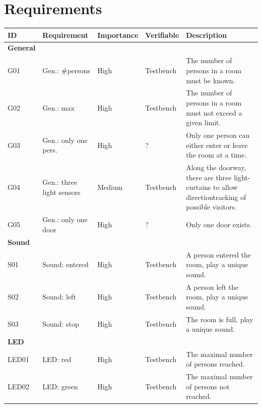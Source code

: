 \documentclass[12pt,a4 paper] {report}
\begin{document}
\chapter{Requirements}
\begin{center}
	\begin{tabular}{|p{1.5cm}|p{3.5cm}|p{2cm}|p{2cm}|p{6cm}|}
		\hline
		\textbf{ID} & \textbf{Requirement} & \textbf{Importance} & \textbf{Verifiable} & \textbf{Description}\\
		\hline
		\textbf{General} & & & & \\
		\hline
		G01 & Gen.: \#persons &  High &  Testbench & The number of persons in a room must be known. \\
		\hline
		G02 & Gen.: max & High &  Testbench & The number of persons in a room must not exceed a given limit. \\
		\hline
		G03 & Gen.: only one pers. & High & ? & Only one person can either enter or leave the room at a time. \\
		\hline
		G04 & Gen.: three light sensors & Medium & Testbench & Along the doorway, there are three light-curtains to allow directiontracking of possible visitors. \\
		\hline
		G05 & Gen.: only one door & High & ? & Only one door exists. \\
		\hline
		\textbf{Sound} & & & & \\
		\hline
		S01 & Sound: entered & High & Testbench & A person entered the room, play a unique sound. \\
		\hline
		S02 & Sound: left & High & Testbench & A person left the room, play a unique sound. \\
		\hline
		S03 & Sound: stop & High & Testbench & The room is full, play a unique sound. \\
		\hline
		\textbf{LED} & & & & \\
		\hline
		LED01 & LED: red &  High & Testbench & The maximal number of persons reached. \\
		\hline
		LED02 & LED: green & High & Testbench & The maximal number of persons not reached. \\
		\hline
	\end{tabular}
\end{center}
\end{document}
